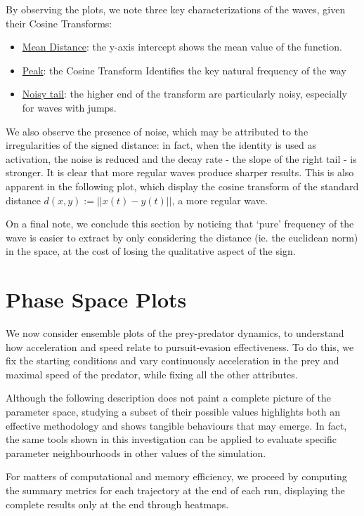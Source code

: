 \documentclass[10pt, twocolumn]{article}
\begin{document}
        By observing the plots, we note three key characterizations of the waves, given their Cosine Transforms:
        \begin{itemize}
          \item \underline{Mean Distance}: the y-axis intercept shows the mean value of the function.
          \item \underline{Peak}: the Cosine Transform Identifies the key natural frequency of the way
          \item \underline{Noisy tail}: the higher end of the transform are particularly noisy, especially for waves with jumps.
        \end{itemize}

        We also observe the presence of noise, which may be attributed to the irregularities of the signed distance: in fact, when the identity is used as activation, the noise is reduced and the decay rate - the slope of the right tail - is stronger. It is clear that more regular waves produce sharper results. This is also apparent in the following plot, which display the cosine transform of the standard distance $d(x,y) := ||x(t)-y(t)||$, a more regular wave.

        On a final note, we conclude this section by noticing that `pure' frequency of the wave is easier to extract by only considering the distance (ie. the euclidean norm) in the space, at the cost of losing the qualitative aspect of the sign.

        \section{Phase Space Plots}
        We now consider ensemble plots of the prey-predator dynamics, to understand how acceleration and speed relate to pursuit-evasion effectiveness. To do this, we fix the starting conditions and vary continuously acceleration in the prey and maximal speed of the predator, while fixing all the other attributes.

        Although the following description does not paint a complete picture of the parameter space, studying a subset of their possible values highlights both an effective methodology and shows tangible behaviours that may emerge. In fact, the same tools shown in this investigation can be applied to evaluate specific parameter neighbourhoods in other values of the simulation.

        For matters of computational and memory efficiency, we proceed by computing the summary metrics for each trajectory at the end of each run, displaying the complete results only at the end through heatmaps.
\end{document}
